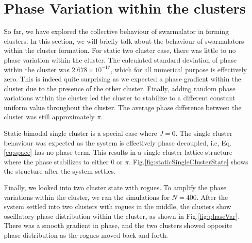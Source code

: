 \documentclass[superscriptaddress,reprint,amssymb, amsmath,aps, pre]{revtex4-1}
\begin{document}
\section{Phase Variation within the clusters}
{
    So far, we have explored the collective behaviour of swarmalator in forming clusters. In this section, we will briefly talk about the behaviour of swarmalators within the cluster formation. For static two cluster case, there was little to no phase variation within the cluster. The calculated standard deviation of phase within the cluster was \(2.678 \times 10^{-17}\), which for all numerical purpose is effectively zero. This is indeed quite surprising as we expected a phase gradient within the cluster due to the presence of the other cluster. Finally, adding random phase variations within the cluster led the cluster to stabilize to a different constant uniform value throughout the cluster. The average phase difference between the cluster was still approximately \(\pi\). 

    Static bimodal single cluster is a special case where \(J = 0\). The single cluster behaviour was expected as the system is effectively phase decoupled, i.e, Eq.\ref{eq:space} has no phase term. This results in a single cluster lattice structure where the phase stabilizes to either \(0\) or \(\pi\). Fig.\ref{fig:staticSingleClusterState} shows the structure after the system settles.

    Finally, we looked into two cluster state with rogues. To amplify the phase variations within the cluster, we ran the simulations for \(N = 400\). After the system settled into two clusters with rogues in the middle, the clusters show oscillatory phase distribution within the cluster, as shown in Fig.\ref{fig:phaseVar}. There was a smooth gradient in phase, and the two clusters showed opposite phase distribution as the rogues moved back and forth. %

}
\end{document}
